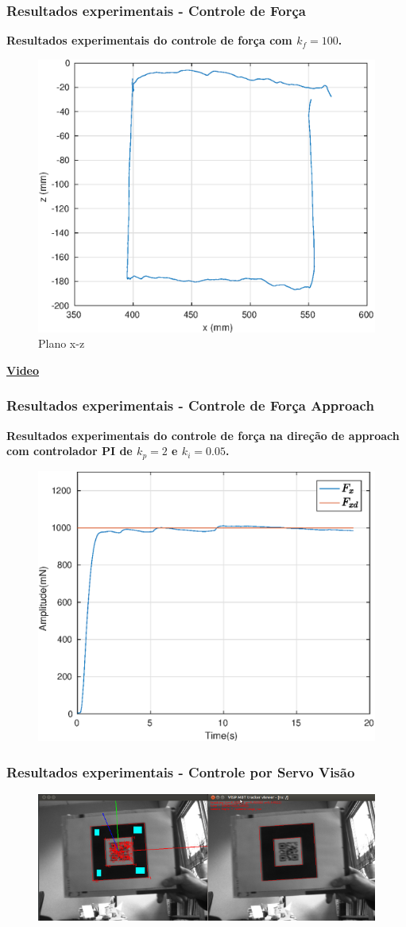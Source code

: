 \documentclass{beamer}
\begin{document}
\begin{frame}
\frametitle{Resultados experimentais - Controle de Força}
\textbf{Resultados experimentais do controle de força com $k_f = 100$.}
\begin{figure}[H]
\includegraphics[width=0.5\linewidth]{./img/float2/xz.eps}
\caption{Plano x-z}
\end{figure}%
\begin{center}
\href{run:forca.mp4}{\textbf{Video}}%
\end{center}
\end{frame}

\begin{frame}
\frametitle{Resultados experimentais - Controle de Força Approach}
\textbf{Resultados experimentais do controle de força na direção de approach com controlador PI de $k_p = 2$ e $k_i = 0.05$. }
\begin{figure}[H]
\includegraphics[width=0.5\linewidth]{./img/force1000_kp2_ki005/Fx.eps}
\end{figure}%
\begin{center}
\end{center}
\end{frame}

\begin{frame}
\frametitle{Resultados experimentais - Controle por Servo Visão}
\begin{figure}[H]
\includegraphics[width=0.5\linewidth]{./img/tracker_viewer-small.png}
\end{figure}%
\end{frame}
\end{document}
